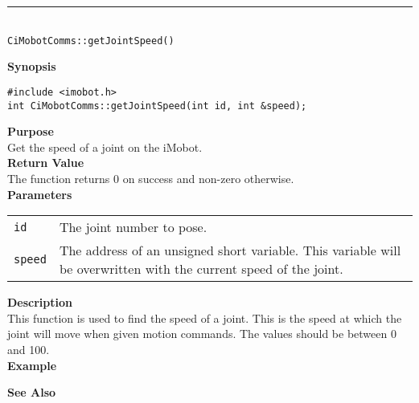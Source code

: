 \noindent
\vspace{5pt}
\rule{4.5in}{0.015in}\\
\noindent
{\LARGE \texttt{CiMobotComms::getJointSpeed()}}\\
{}

\noindent
{\bf Synopsis}\\
\begin{verbatim}
#include <imobot.h>
int CiMobotComms::getJointSpeed(int id, int &speed);
\end{verbatim}

\noindent
{\bf Purpose}\\
Get the speed of a joint on the iMobot.\\

\noindent
{\bf Return Value}\\
The function returns 0 on success and non-zero otherwise.\\

\noindent
{\bf Parameters}
\vspace{-0.1in}
\begin{description}
\item               
\begin{tabular}{p{10 mm}p{145 mm}}
\texttt{id} & The joint number to pose. \\
\texttt{speed} & The address of an unsigned short variable. This variable will be overwritten
with the current speed of the joint.
\end{tabular}
\end{description}

\noindent
{\bf Description}\\
This function is used to find the speed of a joint.  This is the speed at which the joint will move when given motion commands. The values should be between 0 and 100. \\

\noindent
{\bf Example}\\
\noindent

\noindent
{\bf See Also}\\

